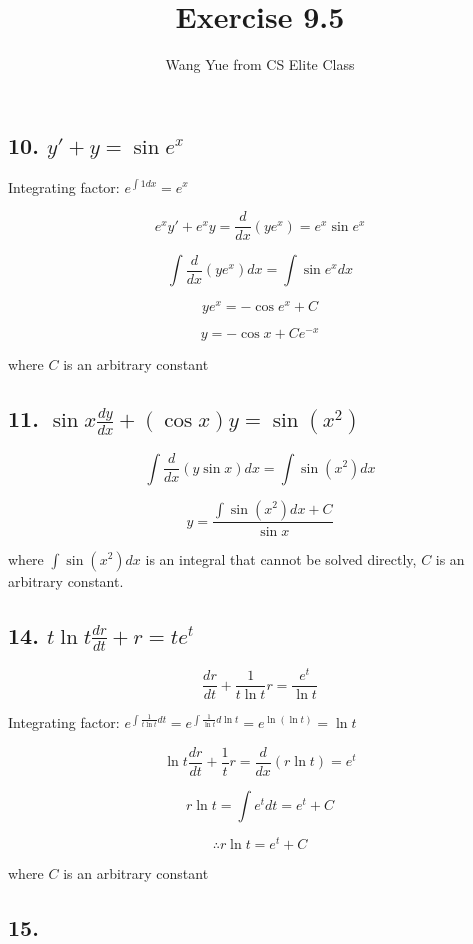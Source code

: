\documentclass{article}
\begin{document}
  \title{Exercise 9.5}
  \author{Wang Yue from CS Elite Class}
  \maketitle

  \subsection*{10. $ y' + y = \sin e^x $}

  Integrating factor: $e^{\int 1 dx} = e^x$

  $$e^x y' + e^x y = \frac{d}{dx} (ye^x) = e^x \sin e^x$$
  
  $$\int \frac{d}{dx} (ye^x) dx = \int \sin e^x dx$$

  $$ye^x = -\cos e^x + C$$

  $$y = -\cos x + Ce^{-x}$$

  where $C$ is an arbitrary constant

  \subsection*{11. $ \sin x \frac{dy}{dx} + (\cos x)y = \sin(x^2) $}

  $$\int \frac{d}{dx} (y \sin x) dx = \int \sin(x^2) dx$$

  $$y = \frac{\int \sin(x^2) dx + C}{ \sin x}$$

  where $\int \sin(x^2) dx$ is an integral that cannot be solved directly, $C$ is an arbitrary constant.

  \subsection*{14. $ t \ln t \frac{dr}{dt} + r = te^t $}

  $$\frac{dr}{dt} + \frac{1}{t\ln t} r = \frac{e^t}{\ln t}$$

  Integrating factor: $ e^{\int \frac{1}{t\ln t} dt} = e^{\int \frac{1}{\ln t} d\ln t} = e^{\ln (\ln t)} = \ln t$

  $$\ln t \frac{dr}{dt} + \frac{1}{t} r = \frac{d}{dx} (r \ln t) = e^t$$

  $$r \ln t = \int e^t dt = e^t + C$$

  $$\therefore r\ln t = e^t + C$$

  where $C$ is an arbitrary constant

  \subsection*{15. }
\end{document}
